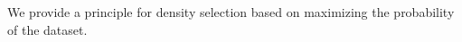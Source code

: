 

We provide a principle for density
selection based on maximizing the
probability of the dataset.

